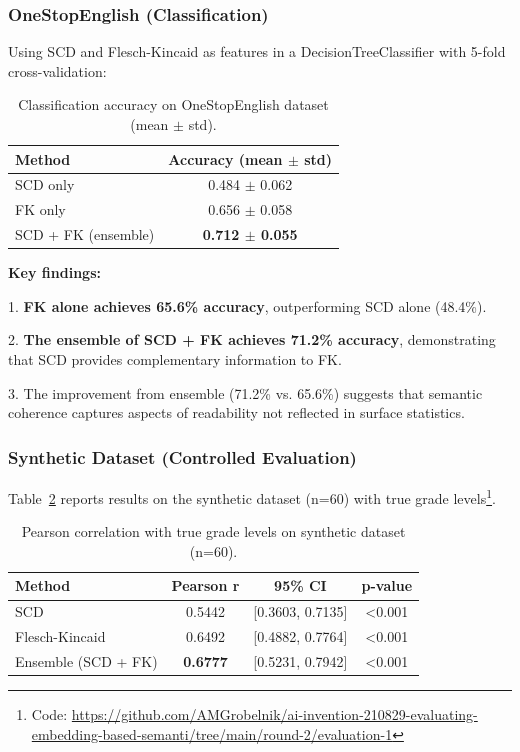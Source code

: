 \documentclass[11pt,letterpaper]{article}
\begin{document}
\subsubsection{OneStopEnglish (Classification)}

Using SCD and Flesch-Kincaid as features in a DecisionTreeClassifier with 5-fold cross-validation:

\begin{table}[!htbp]
  \centering
  \caption{Classification accuracy on OneStopEnglish dataset (mean $\pm$ std).}
  \label{tab:onestop_results}
  \begin{tabular}{lc}
    \toprule
    Method & Accuracy (mean $\pm$ std) \\
    \midrule
    SCD only & 0.484 $\pm$ 0.062 \\
    FK only & 0.656 $\pm$ 0.058 \\
    SCD + FK (ensemble) & \textbf{0.712 $\pm$ 0.055} \\
    \bottomrule
  \end{tabular}
\end{table}

\textbf{Key findings:}

1. \textbf{FK alone achieves 65.6\% accuracy}, outperforming SCD alone (48.4\%).

2. \textbf{The ensemble of SCD + FK achieves 71.2\% accuracy}, demonstrating that SCD provides complementary information to FK.

3. The improvement from ensemble (71.2\% vs. 65.6\%) suggests that semantic coherence captures aspects of readability not reflected in surface statistics.

\subsubsection{Synthetic Dataset (Controlled Evaluation)}

Table~\ref{tab:synthetic_results} reports results on the synthetic dataset (n=60) with true grade levels\footnote{Code: \url{https://github.com/AMGrobelnik/ai-invention-210829-evaluating-embedding-based-semanti/tree/main/round-2/evaluation-1}}.

\begin{table}[!htbp]
  \centering
  \caption{Pearson correlation with true grade levels on synthetic dataset (n=60).}
  \label{tab:synthetic_results}
  \begin{tabular}{lccc}
    \toprule
    Method & Pearson r & 95\% CI & p-value \\
    \midrule
    SCD & 0.5442 & [0.3603, 0.7135] & <0.001 \\
    Flesch-Kincaid & 0.6492 & [0.4882, 0.7764] & <0.001 \\
    Ensemble (SCD + FK) & \textbf{0.6777} & [0.5231, 0.7942] & <0.001 \\
    \bottomrule
  \end{tabular}
\end{table}
\end{document}
